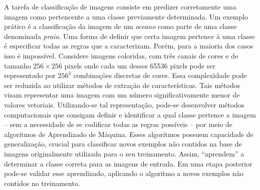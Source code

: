 A tarefa de classificação de imagens consiste em predizer corretamente uma imagem como pertencente a uma classe previamente determinada. Um exemplo prático é a classificação da imagem de um \textit{oceano} como parte de uma classe denominada \textit{praia}. Uma forma de definir que certa imagem pertence à uma classe é especificar todas as regras que a caracterizam.
Porém, para a maioria dos casos isso é impossível. Considere imagens coloridas, com três canais de cores e de tamanho $256\times256$ pixels onde cada um desses 65536 pixels pode ser representado por $256^3$ combinações discretas de cores. Essa complexidade pode ser reduzida ao utilizar métodos de extração de características. Tais métodos visam representar uma imagem com um número significativamente menor de valores vetoriais. Utilizando-se tal representação, pode-se desenvolver métodos computacionais que consigam definir e identificar a qual classe pertence a imagem -- sem a necessidade de se codificar todas as regras possíveis -- por meio de algoritmos de Aprendizado de Máquina. Esses algoritmos possuem capacidade de generalização, crucial para classificar novos exemplos não contidos na base de imagens originalmente utilizada para o seu treinamento. Assim, ``aprendem'' a determinar a classe correta para as imagens de entrada. Em uma etapa posterior pode-se validar esse aprendizado, aplicando o algoritmo a novos exemplos não contidos no treinamento.

